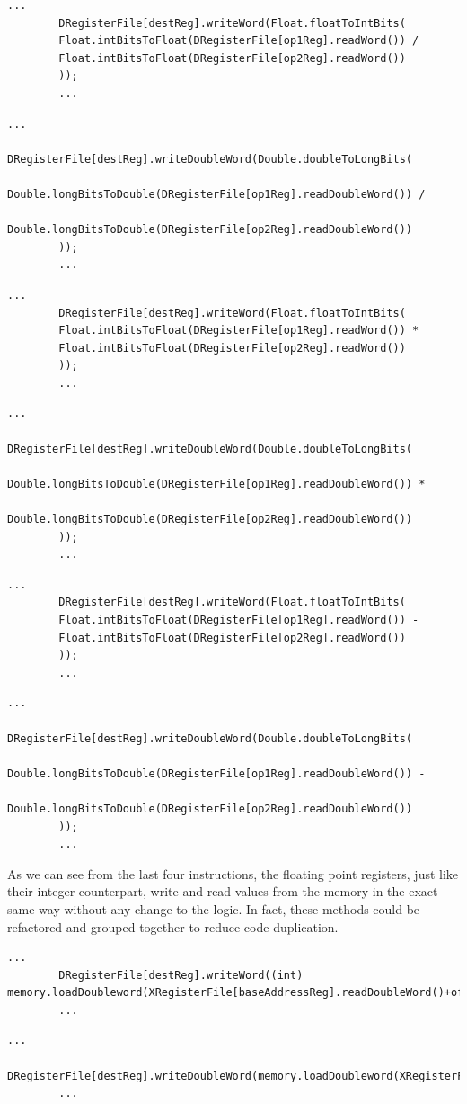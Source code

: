 	\begin{lstlisting}[caption={FDIVS}]
		...
		DRegisterFile[destReg].writeWord(Float.floatToIntBits(
		Float.intBitsToFloat(DRegisterFile[op1Reg].readWord()) /
		Float.intBitsToFloat(DRegisterFile[op2Reg].readWord())
		));
		...
	\end{lstlisting}
	\begin{lstlisting}[caption={FDIVD}]
		...
		DRegisterFile[destReg].writeDoubleWord(Double.doubleToLongBits(
		Double.longBitsToDouble(DRegisterFile[op1Reg].readDoubleWord()) /
		Double.longBitsToDouble(DRegisterFile[op2Reg].readDoubleWord())
		));
		...
	\end{lstlisting}
	\begin{lstlisting}[caption={FMULS}]
		...
		DRegisterFile[destReg].writeWord(Float.floatToIntBits(
		Float.intBitsToFloat(DRegisterFile[op1Reg].readWord()) *
		Float.intBitsToFloat(DRegisterFile[op2Reg].readWord())
		));
		...
	\end{lstlisting}
	\begin{lstlisting}[caption={FMULD}]
		...
		DRegisterFile[destReg].writeDoubleWord(Double.doubleToLongBits(
		Double.longBitsToDouble(DRegisterFile[op1Reg].readDoubleWord()) *
		Double.longBitsToDouble(DRegisterFile[op2Reg].readDoubleWord())
		));
		...
	\end{lstlisting}
	\begin{lstlisting}[caption={FSUBS}]
		...
		DRegisterFile[destReg].writeWord(Float.floatToIntBits(
		Float.intBitsToFloat(DRegisterFile[op1Reg].readWord()) -
		Float.intBitsToFloat(DRegisterFile[op2Reg].readWord())
		));
		...
	\end{lstlisting}
	\begin{lstlisting}[caption={FSUBD}]
		...
		DRegisterFile[destReg].writeDoubleWord(Double.doubleToLongBits(
		Double.longBitsToDouble(DRegisterFile[op1Reg].readDoubleWord()) -
		Double.longBitsToDouble(DRegisterFile[op2Reg].readDoubleWord())
		));
		...
	\end{lstlisting}
	
	As we can see from the last four instructions, the floating point registers, just like their integer counterpart, write and read values from the memory in the exact same way without any change to the logic. In fact, these methods could be refactored and grouped together to reduce code duplication.
	
	\begin{lstlisting}[caption={LDURS}]
		...
		DRegisterFile[destReg].writeWord((int) memory.loadDoubleword(XRegisterFile[baseAddressReg].readDoubleWord()+offset));
		...
	\end{lstlisting}
	\begin{lstlisting}[caption={LDURD}]
		...
		DRegisterFile[destReg].writeDoubleWord(memory.loadDoubleword(XRegisterFile[baseAddressReg].readDoubleWord()+offset));
		...
	\end{lstlisting}
	
